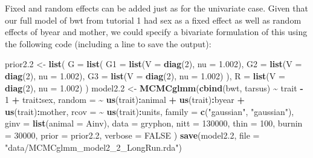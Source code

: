 \documentclass[
  12pt,
]{book}
\newenvironment{Shaded}{\begin{snugshade}}{\end{snugshade}}
\newcommand{\DataTypeTok}[1]{\textcolor[rgb]{0.13,0.29,0.53}{#1}}
\newcommand{\DecValTok}[1]{\textcolor[rgb]{0.00,0.00,0.81}{#1}}
\newcommand{\FloatTok}[1]{\textcolor[rgb]{0.00,0.00,0.81}{#1}}
\newcommand{\KeywordTok}[1]{\textcolor[rgb]{0.13,0.29,0.53}{\textbf{#1}}}
\newcommand{\NormalTok}[1]{#1}
\newcommand{\OperatorTok}[1]{\textcolor[rgb]{0.81,0.36,0.00}{\textbf{#1}}}
\newcommand{\OtherTok}[1]{\textcolor[rgb]{0.56,0.35,0.01}{#1}}
\newcommand{\StringTok}[1]{\textcolor[rgb]{0.31,0.60,0.02}{#1}}
\begin{document}
Fixed and random effects can be added just as for the univariate case.
Given that our full model of bwt from tutorial 1 had sex as a fixed effect as well as random effects of byear and mother, we could specify a bivariate formulation of this using the following code (including a line to save the output):

\begin{Shaded}
\begin{Highlighting}[]
\NormalTok{prior2}\FloatTok{.2}\NormalTok{ \textless{}{-}}\StringTok{ }\KeywordTok{list}\NormalTok{(}
  \DataTypeTok{G =} \KeywordTok{list}\NormalTok{(}
    \DataTypeTok{G1 =} \KeywordTok{list}\NormalTok{(}\DataTypeTok{V =} \KeywordTok{diag}\NormalTok{(}\DecValTok{2}\NormalTok{), }\DataTypeTok{nu =} \FloatTok{1.002}\NormalTok{),}
    \DataTypeTok{G2 =} \KeywordTok{list}\NormalTok{(}\DataTypeTok{V =} \KeywordTok{diag}\NormalTok{(}\DecValTok{2}\NormalTok{), }\DataTypeTok{nu =} \FloatTok{1.002}\NormalTok{),}
    \DataTypeTok{G3 =} \KeywordTok{list}\NormalTok{(}\DataTypeTok{V =} \KeywordTok{diag}\NormalTok{(}\DecValTok{2}\NormalTok{), }\DataTypeTok{nu =} \FloatTok{1.002}\NormalTok{)}
\NormalTok{  ),}
  \DataTypeTok{R =} \KeywordTok{list}\NormalTok{(}\DataTypeTok{V =} \KeywordTok{diag}\NormalTok{(}\DecValTok{2}\NormalTok{), }\DataTypeTok{nu =} \FloatTok{1.002}\NormalTok{)}
\NormalTok{)}
\NormalTok{model2}\FloatTok{.2}\NormalTok{ \textless{}{-}}\StringTok{ }\KeywordTok{MCMCglmm}\NormalTok{(}\KeywordTok{cbind}\NormalTok{(bwt, tarsus) }\OperatorTok{\textasciitilde{}}\StringTok{ }\NormalTok{trait }\OperatorTok{{-}}\StringTok{ }\DecValTok{1} \OperatorTok{+}\StringTok{ }\NormalTok{trait}\OperatorTok{:}\NormalTok{sex,}
  \DataTypeTok{random =} \OperatorTok{\textasciitilde{}}\StringTok{ }\KeywordTok{us}\NormalTok{(trait)}\OperatorTok{:}\NormalTok{animal }\OperatorTok{+}\StringTok{ }\KeywordTok{us}\NormalTok{(trait)}\OperatorTok{:}\NormalTok{byear }\OperatorTok{+}\StringTok{ }\KeywordTok{us}\NormalTok{(trait)}\OperatorTok{:}\NormalTok{mother,}
  \DataTypeTok{rcov =} \OperatorTok{\textasciitilde{}}\StringTok{ }\KeywordTok{us}\NormalTok{(trait)}\OperatorTok{:}\NormalTok{units,}
  \DataTypeTok{family =} \KeywordTok{c}\NormalTok{(}\StringTok{"gaussian"}\NormalTok{, }\StringTok{"gaussian"}\NormalTok{),}
  \DataTypeTok{ginv =} \KeywordTok{list}\NormalTok{(}\DataTypeTok{animal =}\NormalTok{ Ainv), }\DataTypeTok{data =}\NormalTok{ gryphon,}
  \DataTypeTok{nitt =} \DecValTok{130000}\NormalTok{, }\DataTypeTok{thin =} \DecValTok{100}\NormalTok{, }\DataTypeTok{burnin =} \DecValTok{30000}\NormalTok{,}
  \DataTypeTok{prior =}\NormalTok{ prior2}\FloatTok{.2}\NormalTok{, }\DataTypeTok{verbose =} \OtherTok{FALSE}
\NormalTok{)}
\KeywordTok{save}\NormalTok{(model2}\FloatTok{.2}\NormalTok{, }\DataTypeTok{file =} \StringTok{"data/MCMCglmm\_model2\_2\_LongRun.rda"}\NormalTok{)}
\end{Highlighting}
\end{Shaded}
\end{document}
